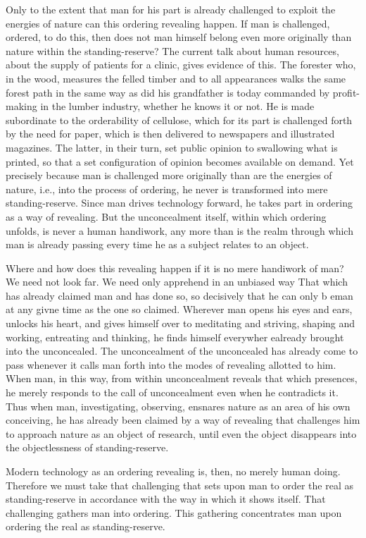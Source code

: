 Only to the extent that man for his part is already challenged to exploit the energies of nature can this ordering revealing happen. If man is challenged, ordered, to do this, then does not man himself belong even more originally than nature within the standing-reserve? The current talk about human resources, about the supply of patients for a clinic, gives evidence of this. The forester who, in the wood, measures the felled timber and to all appearances walks the same forest path in the same way as did his grandfather is today commanded by profit-making in the lumber industry, whether he knows it or not. He is made subordinate to the orderability of cellulose, which for its part is challenged forth by the need for paper, which is then delivered to newspapers and illustrated magazines. The latter, in their turn, set public opinion to swallowing what is printed, so that a set configuration of opinion becomes available on demand. Yet precisely because man is challenged more originally than are the energies of nature, i.e., into the process of ordering, he never is transformed into mere standing-reserve. Since man drives technology forward, he takes part in ordering as a way of revealing. But the unconcealment itself, within which ordering unfolds, is never a human handiwork, any more than is the realm through which man is already passing every time he as a subject relates to an object.

Where and how does this revealing happen if it is no mere handiwork of man? We need not look far. We need only apprehend in an unbiased way That which has already claimed man and has done so, so decisively that he can only b eman at any givne time as the one so claimed. Wherever man opens his eyes and ears, unlocks his heart, and gives himself over to meditating and striving, shaping and working, entreating and thinking, he finds himself everywher ealready brought into the unconcealed. The unconcealment of the unconcealed has already come to pass whenever it calls man forth into the modes of revealing allotted to him. When man, in this way, from within unconcealment reveals that which presences, he merely responds to the call of unconcealment even when he contradicts it. Thus when man, investigating, observing, ensnares nature as an area of his own conceiving, he has already been claimed by a way  of revealing that challenges him to approach nature as an object of research, until even the object disappears into the objectlessness of standing-reserve.

Modern technology as an ordering revealing is, then, no merely human doing. Therefore we must take that challenging that sets upon man to order the real as standing-reserve in accordance with the way in which it shows itself. That challenging gathers man into ordering. This gathering concentrates man upon ordering the real as standing-reserve.

